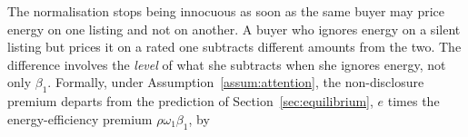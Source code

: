 The normalisation stops being innocuous as soon as the same buyer may price energy on one listing and not on another. A buyer who ignores energy on a silent listing but prices it on a rated one subtracts different amounts from the two. The difference involves the \emph{level} of what she subtracts when she ignores energy, not only $\beta_1$. Formally, under Assumption~\ref{assum:attention}, the non-disclosure premium departs from the prediction of Section~\ref{sec:equilibrium}, $e$ times the energy-efficiency premium $\rho\omega_1\beta_1$, by
